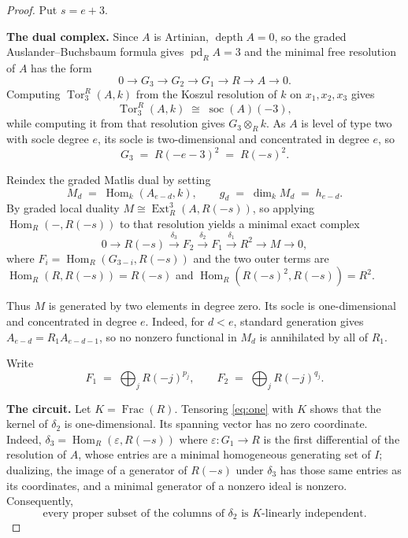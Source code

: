 \documentclass[11pt]{article}
\theoremstyle{remark}
\newcommand{\Frac}{\operatorname{Frac}}
\newcommand{\Hom}{\operatorname{Hom}}
\newcommand{\Ext}{\operatorname{Ext}}
\newcommand{\soc}{\operatorname{soc}}
\begin{document}
\begin{proof}
Put $s = e + 3$.

\medskip
\noindent\textbf{The dual complex.}
Since $A$ is Artinian, $\operatorname{depth} A = 0$, so the graded
Auslander--Buchsbaum formula gives $\operatorname{pd}_R A = 3$ and the
minimal free resolution of $A$ has the form
\[
  0 \longrightarrow G_3 \longrightarrow G_2 \longrightarrow G_1
    \longrightarrow R \longrightarrow A \longrightarrow 0 .
\]
Computing $\operatorname{Tor}^R_3(A,k)$ from the Koszul resolution of $k$ on
$x_1,x_2,x_3$ gives
\[
  \operatorname{Tor}^R_3(A,k) \;\cong\; \soc(A)(-3),
\]
while computing it from that resolution gives $G_3 \otimes_R k$. As $A$ is level
of type two with socle degree $e$, its socle is two-dimensional and
concentrated in degree $e$, so
\[
  G_3 \;=\; R(-e-3)^2 \;=\; R(-s)^2 .
\]

Reindex the graded Matlis dual by setting
\[
  M_d \;=\; \Hom_k(A_{e-d}, k), \qquad
  g_d \;=\; \dim_k M_d \;=\; h_{e-d} .
\]
By graded local duality $M \cong \Ext^3_R(A, R(-s))$, so applying
$\Hom_R(-, R(-s))$ to that resolution yields a minimal exact complex
\begin{equation} \label{eq:one}
  0 \longrightarrow R(-s) \xrightarrow{\;\delta_3\;} F_2
    \xrightarrow{\;\delta_2\;} F_1 \xrightarrow{\;\delta_1\;} R^2
    \longrightarrow M \longrightarrow 0,
\end{equation}
where $F_i = \Hom_R(G_{3-i}, R(-s))$ and the two outer terms are
$\Hom_R(R, R(-s)) = R(-s)$ and $\Hom_R(R(-s)^2, R(-s)) = R^2$.

Thus $M$ is generated by two elements in degree zero. Its socle is
one-dimensional and concentrated in degree $e$. Indeed, for $d < e$,
standard generation gives $A_{e-d} = R_1 A_{e-d-1}$, so no nonzero
functional in $M_d$ is annihilated by all of $R_1$.

Write
\[
  F_1 \;=\; \bigoplus_j R(-j)^{p_j}, \qquad
  F_2 \;=\; \bigoplus_j R(-j)^{q_j} .
\]

\medskip
\noindent\textbf{The circuit.}
Let $K = \Frac(R)$. Tensoring \eqref{eq:one} with $K$ shows that the kernel
of $\delta_2$ is one-dimensional. Its spanning vector has no zero
coordinate. Indeed, $\delta_3 = \Hom_R(\varepsilon, R(-s))$ where
$\varepsilon \colon G_1 \to R$ is the first differential of the resolution
of $A$, whose entries are a minimal homogeneous generating set of
$I$; dualizing, the image of a generator of $R(-s)$ under $\delta_3$ has
those same entries as its coordinates, and a minimal generator of a nonzero
ideal is nonzero. Consequently,
\begin{equation} \label{eq:two}
  \text{every proper subset of the columns of } \delta_2
  \text{ is } K\text{-linearly independent.}
\end{equation}


\end{proof}
\end{document}
